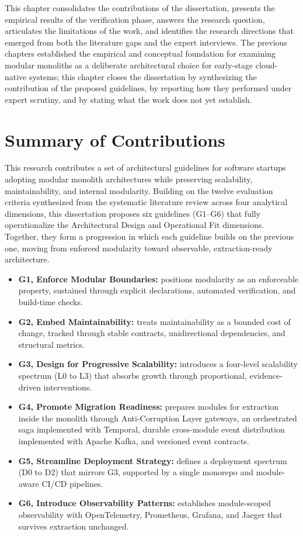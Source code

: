 \label{sec:conclusion}

This chapter consolidates the contributions of the dissertation, presents the empirical results of the verification phase, answers the research question, articulates the limitations of the work, and identifies the research directions that emerged from both the literature gaps and the expert interviews. The previous chapters established the empirical and conceptual foundation for examining modular monoliths as a deliberate architectural choice for early-stage cloud-native systems; this chapter closes the dissertation by synthesizing the contribution of the proposed guidelines, by reporting how they performed under expert scrutiny, and by stating what the work does not yet establish.

\section{Summary of Contributions}

This research contributes a set of architectural guidelines for software startups adopting modular monolith architectures while preserving scalability, maintainability, and internal modularity. Building on the twelve evaluation criteria synthesized from the systematic literature review across four analytical dimensions, this dissertation proposes six guidelines (G1--G6) that fully operationalize the Architectural Design and Operational Fit dimensions. Together, they form a progression in which each guideline builds on the previous one, moving from enforced modularity toward observable, extraction-ready architecture.

\begin{itemize}[itemsep=8pt,topsep=4pt]
  \item \textbf{G1, Enforce Modular Boundaries:} positions modularity as an enforceable property, sustained through explicit declarations, automated verification, and build-time checks.
  \item \textbf{G2, Embed Maintainability:} treats maintainability as a bounded cost of change, tracked through stable contracts, unidirectional dependencies, and structural metrics.
  \item \textbf{G3, Design for Progressive Scalability:} introduces a four-level scalability spectrum (L0 to L3) that absorbs growth through proportional, evidence-driven interventions.
  \item \textbf{G4, Promote Migration Readiness:} prepares modules for extraction inside the monolith through Anti-Corruption Layer gateways, an orchestrated saga implemented with Temporal, durable cross-module event distribution implemented with Apache Kafka, and versioned event contracts.
  \item \textbf{G5, Streamline Deployment Strategy:} defines a deployment spectrum (D0 to D2) that mirrors G3, supported by a single monorepo and module-aware CI/CD pipelines.
  \item \textbf{G6, Introduce Observability Patterns:} establishes module-scoped observability with OpenTelemetry, Prometheus, Grafana, and Jaeger that survives extraction unchanged.
\end{itemize}

